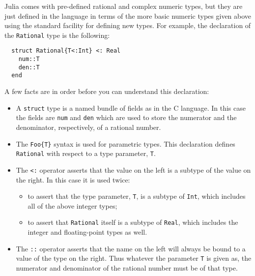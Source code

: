 \documentclass{article}
\begin{document}
Julia comes with pre-defined rational and complex numeric types, but they are just defined in the language in terms of the more basic numeric types given above using the standard facility for defining new types. For example, the declaration of the \texttt{Rational} type is the following:
\begin{verbatim}
  struct Rational{T<:Int} <: Real
    num::T
    den::T
  end
\end{verbatim}
A few facts are in order before you can understand this declaration:
\begin{itemize}
\item A \texttt{struct} type is a named bundle of fields as in the C language. In this case the fields are \texttt{num} and \texttt{den} which are used to store the numerator and the denominator, respectively, of a rational number.
\item The \texttt{Foo\{T\}} syntax is used for parametric types. This declaration defines \texttt{Rational} with respect to a type parameter, \texttt{T}.
\item The \texttt{<:} operator asserts that the value on the left is a subtype of the value on the right. In this case it is used twice:
  \begin{itemize}
    \item to assert that the type parameter, \texttt{T}, is a subtype of \texttt{Int}, which includes all of the above integer types;
    \item to assert that \texttt{Rational} itself is a subtype of \texttt{Real}, which includes the integer and floating-point types as well.
  \end{itemize}
\item The \texttt{::} operator asserts that the name on the left will always be bound to a value of the type on the right. Thus whatever the parameter \texttt{T} is given as, the numerator and denominator of the rational number must be of that type.
\end{itemize}
\end{document}
